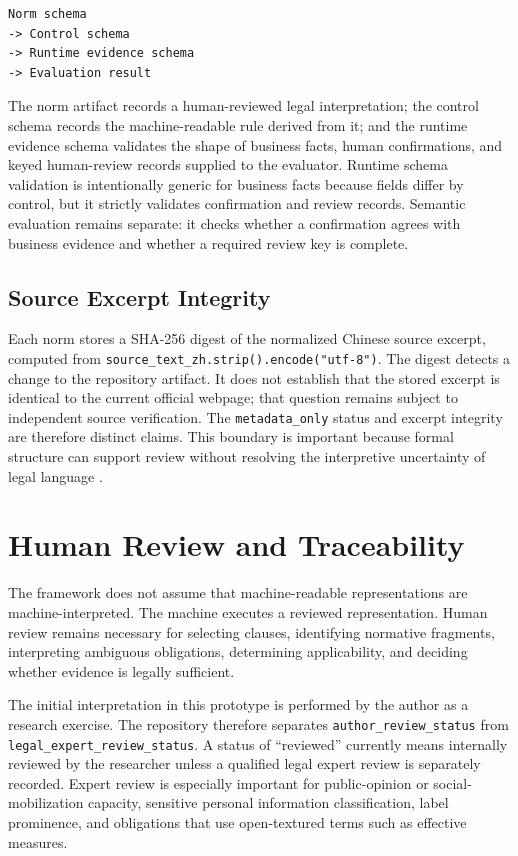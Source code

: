 \documentclass[10pt,journal]{IEEEtran}
\begin{document}
\begin{lstlisting}
Norm schema
-> Control schema
-> Runtime evidence schema
-> Evaluation result
\end{lstlisting}

The norm artifact records a human-reviewed legal interpretation; the control schema records the machine-readable rule derived from it; and the runtime evidence schema validates the shape of business facts, human confirmations, and keyed human-review records supplied to the evaluator. Runtime schema validation is intentionally generic for business facts because fields differ by control, but it strictly validates confirmation and review records. Semantic evaluation remains separate: it checks whether a confirmation agrees with business evidence and whether a required review key is complete.

\subsection{Source Excerpt Integrity}

Each norm stores a SHA-256 digest of the normalized Chinese source excerpt, computed from \texttt{source\_text\_zh.strip().encode("utf-8")}. The digest detects a change to the repository artifact. It does not establish that the stored excerpt is identical to the current official webpage; that question remains subject to independent source verification. The \texttt{metadata\_only} status and excerpt integrity are therefore distinct claims. This boundary is important because formal structure can support review without resolving the interpretive uncertainty of legal language \cite{mohun2020cracking,sergot1986nationality}.

\section{Human Review and Traceability}

The framework does not assume that machine-readable representations are machine-interpreted. The machine executes a reviewed representation. Human review remains necessary for selecting clauses, identifying normative fragments, interpreting ambiguous obligations, determining applicability, and deciding whether evidence is legally sufficient.

The initial interpretation in this prototype is performed by the author as a research exercise. The repository therefore separates \texttt{author\_review\_status} from \texttt{legal\_expert\_review\_status}. A status of ``reviewed'' currently means internally reviewed by the researcher unless a qualified legal expert review is separately recorded. Expert review is especially important for public-opinion or social-mobilization capacity, sensitive personal information classification, label prominence, and obligations that use open-textured terms such as effective measures.
\end{document}
